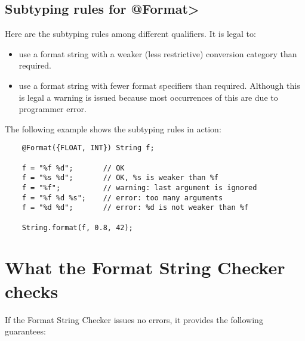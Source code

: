 \subsection{Subtyping rules for \<@Format>\label{formatter-format-subtyping}}

Here are the subtyping rules among different
qualifiers.
It is legal to:

\begin{itemize}
\item use a format string with a weaker (less restrictive) conversion category than required.
\item use a format string with fewer format specifiers than required.
  Although this is legal a warning is issued because most occurrences of
  this are due to programmer error.
\end{itemize}

The following example shows the subtyping rules in action:

\begin{Verbatim}
    @Format({FLOAT, INT}) String f;

    f = "%f %d";       // OK
    f = "%s %d";       // OK, %s is weaker than %f
    f = "%f";          // warning: last argument is ignored
    f = "%f %d %s";    // error: too many arguments
    f = "%d %d";       // error: %d is not weaker than %f

    String.format(f, 0.8, 42);
\end{Verbatim}

\section{What the Format String Checker checks\label{formatter-guarantees}}

If the Format String Checker issues no errors, it provides the following guarantees:

